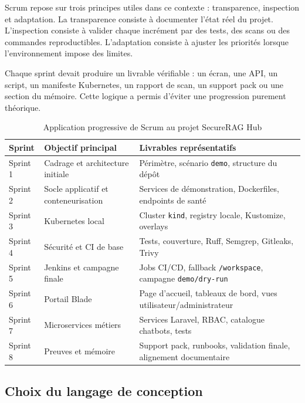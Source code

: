 Scrum repose sur trois principes utiles dans ce contexte : transparence, inspection et adaptation. La transparence consiste à documenter l'état réel du projet. L'inspection consiste à valider chaque incrément par des tests, des scans ou des commandes reproductibles. L'adaptation consiste à ajuster les priorités lorsque l'environnement impose des limites.

Chaque sprint devait produire un livrable vérifiable : un écran, une API, un script, un manifeste Kubernetes, un rapport de scan, un support pack ou une section du mémoire. Cette logique a permis d'éviter une progression purement théorique.

\begin{table}[htbp]
    \centering
    \begin{tabular}{|p{2.2cm}|p{5.2cm}|p{6.2cm}|}
        \hline
        \textbf{Sprint} & \textbf{Objectif principal} & \textbf{Livrables représentatifs} \\
        \hline
        Sprint 1 & Cadrage et architecture initiale & Périmètre, scénario \texttt{demo}, structure du dépôt \\
        \hline
        Sprint 2 & Socle applicatif et conteneurisation & Services de démonstration, Dockerfiles, endpoints de santé \\
        \hline
        Sprint 3 & Kubernetes local & Cluster \texttt{kind}, registry locale, Kustomize, overlays \\
        \hline
        Sprint 4 & Sécurité et CI de base & Tests, couverture, Ruff, Semgrep, Gitleaks, Trivy \\
        \hline
        Sprint 5 & Jenkins et campagne finale & Jobs CI/CD, fallback \texttt{/workspace}, campagne \texttt{demo/dry-run} \\
        \hline
        Sprint 6 & Portail Blade & Page d'accueil, tableaux de bord, vues utilisateur/administrateur \\
        \hline
        Sprint 7 & Microservices métiers & Services Laravel, RBAC, catalogue chatbots, tests \\
        \hline
        Sprint 8 & Preuves et mémoire & Support pack, runbooks, validation finale, alignement documentaire \\
        \hline
    \end{tabular}
    \caption{Application progressive de Scrum au projet SecureRAG Hub}
    \label{tab:sprints_securerag}
\end{table}

\subsection{Choix du langage de conception}

